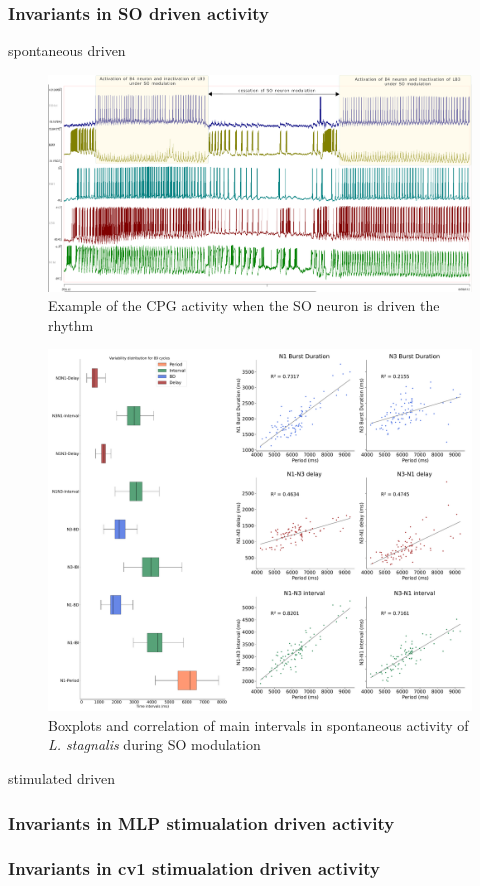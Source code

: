 \subsubsection{Invariants in SO driven activity}
\large{spontaneous driven}
 
 	
 	
\begin{figure}[bth!]
	\centering
	\includegraphics[width=\textwidth]{img/invariants/SO-spontaneuous-driven.pdf}
	\caption{Example of the CPG activity when the SO neuron is driven the rhythm}
	\label{fig:SO-spontaneuous-driven}
\end{figure}




\begin{figure}[bth!]
	\centering
	\includegraphics[width=\textwidth]{img/invariants/prep4_so_driven_2 intervals panel.pdf}
	\caption{Boxplots and correlation of main intervals in spontaneous activity of \textit{L. stagnalis} during SO modulation}
	\label{fig:prep4 so driven invariants}
\end{figure}
 	
 
 
\large{stimulated driven}


\subsubsection{Invariants in MLP stimualation driven activity}
\subsubsection{Invariants in cv1 stimualation driven activity}